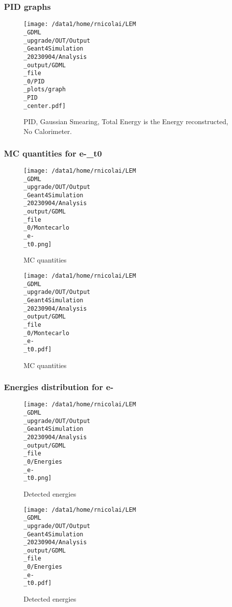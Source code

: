 \documentclass[8pt]{beamer}
\begin{document}
            \begin{frame}
                \frametitle{PID graphs}
            
        \begin{figure}[h]
            \centering
            \texttt{[image: /data1/home/rnicolai/LEM\\\_GDML\\\_upgrade/OUT/Output\\\_Geant4Simulation\\\_20230904/Analysis\\\_output/GDML\\\_file\\\_0/PID\\\_plots/graph\\\_PID\\\_center.pdf]}
            \caption{PID, Gaussian Smearing, Total Energy is the Energy reconstructed, No Calorimeter.}
        \end{figure}
        
            \end{frame}
            
            \begin{frame}
                \frametitle{MC quantities for e-\_t0}
            
        \begin{figure}[h]
            \centering
            \texttt{[image: /data1/home/rnicolai/LEM\\\_GDML\\\_upgrade/OUT/Output\\\_Geant4Simulation\\\_20230904/Analysis\\\_output/GDML\\\_file\\\_0/Montecarlo\\\_e-\\\_t0.png]}
            \caption{MC quantities}
        \end{figure}
        
        \begin{figure}[h]
            \centering
            \texttt{[image: /data1/home/rnicolai/LEM\\\_GDML\\\_upgrade/OUT/Output\\\_Geant4Simulation\\\_20230904/Analysis\\\_output/GDML\\\_file\\\_0/Montecarlo\\\_e-\\\_t0.pdf]}
            \caption{MC quantities}
        \end{figure}
        
            \end{frame}
            
            \begin{frame}
                \frametitle{Energies distribution for e-}
            
        \begin{figure}[h]
            \centering
            \texttt{[image: /data1/home/rnicolai/LEM\\\_GDML\\\_upgrade/OUT/Output\\\_Geant4Simulation\\\_20230904/Analysis\\\_output/GDML\\\_file\\\_0/Energies\\\_e-\\\_t0.png]}
            \caption{Detected energies}
        \end{figure}
        
        \begin{figure}[h]
            \centering
            \texttt{[image: /data1/home/rnicolai/LEM\\\_GDML\\\_upgrade/OUT/Output\\\_Geant4Simulation\\\_20230904/Analysis\\\_output/GDML\\\_file\\\_0/Energies\\\_e-\\\_t0.pdf]}
            \caption{Detected energies}
        \end{figure}
        
            \end{frame}
            
\end{document}
